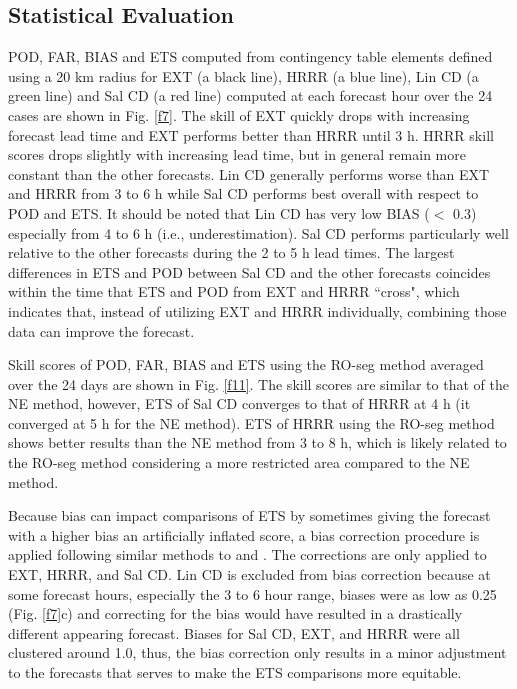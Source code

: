 \documentclass[12pt]{article}
\begin{document}
\subsection{Statistical Evaluation}
POD, FAR, BIAS and ETS computed from contingency table elements defined using a 20 km radius for EXT (a black line), HRRR (a blue line), Lin CD (a green line) and Sal CD (a red line) computed at each forecast hour over the 24 cases are shown in Fig. \ref{f7}. The skill of EXT quickly drops with increasing forecast lead time and EXT performs better than HRRR until 3 h. HRRR skill scores drops slightly with increasing lead time, but in general remain more constant than the other forecasts. Lin CD generally performs worse than EXT and HRRR from 3 to 6 h while Sal CD performs best overall with respect to POD and ETS. It should be noted that Lin CD has very low BIAS ($<$ 0.3) especially from 4 to 6 h (i.e., underestimation). Sal CD performs particularly well relative to the other forecasts during the 2 to 5 h lead times. The largest differences in ETS and POD between Sal CD and the other forecasts coincides within the time that ETS and POD from EXT and HRRR ``cross", which indicates that, instead of utilizing EXT and HRRR individually, combining those data can improve the forecast. 

Skill scores of POD, FAR, BIAS and ETS using the RO-seg method averaged over the 24 days are shown in Fig. \ref{f11}. The skill scores are similar to that of the NE method, however, ETS of Sal CD converges to that of HRRR at 4 h (it converged at 5 h for the NE method). ETS of HRRR using the RO-seg method shows better results than the NE method from 3 to 8 h, which is likely related to the RO-seg method considering a more restricted area compared to the NE method.   

Because bias can impact comparisons of ETS by sometimes giving the forecast with a higher bias an artificially inflated score, a bias correction procedure is applied following similar methods to \citet{jenkner08} and \citet{clark11}. The corrections are only applied to EXT, HRRR, and Sal CD. Lin CD is excluded from bias correction because at some forecast hours, especially the 3 to 6 hour range, biases were as low as 0.25 (Fig. \ref{f7}c) and correcting for the bias would have resulted in a drastically different appearing forecast. Biases for Sal CD, EXT, and HRRR were all clustered around 1.0, thus, the bias correction only results in a minor adjustment to the forecasts that serves to make the ETS comparisons more equitable.
\end{document}
